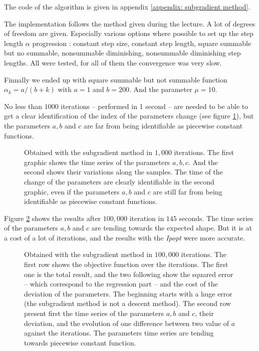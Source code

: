 \documentclass[11pt]{article}
\begin{document}
    The code of the algorithm is given in appendix \ref{appendix: subgradient method}.

    The implementation follows the method given during the lecture. A lot of degrees of freedom are given. Especially various options where possible to set up the step length $\alpha$ progression : constant step size, constant step length, square summable but no summable, nonsummable diminishing, nonsummable diminishing step lengths.
    All were tested, for all of them the convergence was very slow.
    
    Finnally we ended up with square summable but not summable function $\alpha_k = a/(b + k)$ with $a = 1$ and $b = 200$. And the parameter $\mu=10$.

    No less than $1000$ iterations -- performed in 1 second -- are needed to be able to get a clear identification of the index of the parameters change (see figure \ref{fig:subgradient1000}), but the parameters $a,b$ and $c$ are far from being identifiable as piecewise constant functions.

    \begin{figure}[h]
        \centering
        
        \caption{\label{fig:subgradient1000} Obtained with the subgradient method in $1,000$ iterations. The first graphic shows the time series of the parameters $a,b,c$. And the second shows their variations along the samples. The time of the change of the parameters are clearly identifiable in the second graphic, even if the parameters $a,b$ and $c$ are still far from being identifiable as piecewise constant functions.}
    \end{figure}

    Figure \ref{fig:subgradient} shows the results after $100,000$ iteration in $145$ seconds. The time series of the parameters $a,b$ and $c$ are tending towards the expected shape. But it is at a cost of a lot of iterations, and the results with the \emph{Ipopt} were more accurate.

    \begin{figure}[h]
        \centering
        
        \caption{\label{fig:subgradient} Obtained with the subgradient method in $100,000$ iterations. The first row shows the objective function over the iterations. The first one is the total result, and the two following show the squared error -- which correspond to the regression part -- and the cost of the deviation of the parameters. The beginning starts with a huge error (the subgradient method is not a descent method). The second row present first the time series of the parameters $a,b$ and $c$, their deviation, and the evolution of one difference between two value of $a$ against the iterations. The parameters time series are tending towards piecewise constant function.}
    \end{figure}
\end{document}
